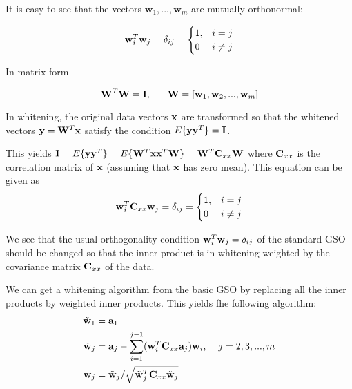 \begin{enumerate}
\begin{solution}
\begin{enumerate}
      It is easy to see that the vectors $\textbf{w}_1, ...,
      \textbf{w}_m$ are mutually orthonormal:

      \[\mathbf{w}_i^T\mathbf{w}_j = \delta_{ij} = \begin{cases}1, &i=j\\0 &i\neq
        j\end{cases}
      \]

      In matrix form

      \[
      \mathbf{W}^T\mathbf{W} = \mathbf{I}, \hspace{6mm}\mathbf{W} =
      [\mathbf{w}_1, \mathbf{w}_2, ..., \mathbf{w}_m]
      \]

      In whitening, the original data vectors $\mathbf{x}$ are transformed
      so that the whitened vectors $\textbf{y}=\mathbf{W}^T\mathbf{x}$
      satisfy the condition $E\lbrace \textbf{y}\textbf{y}^T
      \rbrace=\mathbf{I}$.

      This yields $\mathbf{I} = E\lbrace \textbf{y}\textbf{y}^T
      \rbrace = E\lbrace
      \mathbf{W}^T\mathbf{x}\mathbf{x}^T\mathbf{W}\rbrace=\mathbf{W}^T
      \textbf{C}_{xx} \mathbf{W}$ where $\mathbf{C}_{xx}$ is the
      correlation matrix of $\mathbf{x}$ (assuming that $\mathbf{x}$ has
      zero mean).  This equation can be given as
      \begin{equation}
        \mathbf{w}_i^T\mathbf{C}_{xx}\mathbf{w}_j = \delta_{ij}
        = \begin{cases}1, &i=j\\0 &i\neq j\end{cases}
        \label{eq:delta}
      \end{equation}
      

      We see that the usual orthogonality condition
      $\mathbf{w}_i^T\mathbf{w}_j = \delta_{ij}$ of the standard GSO
      should be changed so that the inner product is in whitening
      weighted by the covariance matrix $\mathbf{C}_{xx}$ of the data.

      We can get a whitening algorithm from the basic GSO by replacing
      all the inner products by weighted inner products. This yields
      fhe following algorithm:
      \[
      \begin{split}
        \tilde{\mathbf{w}}_1 &= \mathbf{a}_1 \\
        \tilde{\mathbf{w}}_j &= \mathbf{a}_j - \sum_{i=1}^{j-1}
        (\mathbf{w}_i^T\mathbf{C}_{xx}\mathbf{a}_j)\mathbf{w}_i, \hspace{4mm}
        j=2,3,...,m
        \\
        \mathbf{w}_j &=
        \tilde{\mathbf{w}}_j/\sqrt{\tilde{\mathbf{w}}_j^T
          \mathbf{C}_{xx}\tilde{\mathbf{w}}_j} 
      \end{split}
      \]


\end{enumerate}
\end{solution}
\end{enumerate}

